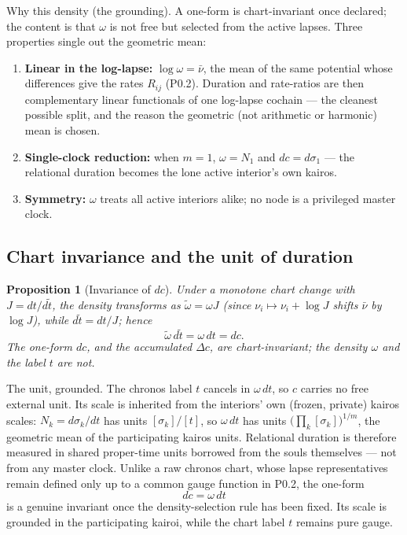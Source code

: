 \documentclass[11pt,a4paper]{article}
\def\mathfrak#1{#1}%
\def\emph#1{#1}%
\theoremstyle{definition}
\theoremstyle{plain}
\newtheorem{proposition}[definition]{Proposition}
\theoremstyle{remark}
\begin{document}
\emph{Why this density (the grounding).} A one-form is chart-invariant once declared;
the content is that \(\omega\) is not free but selected from the active lapses. Three
properties single out the geometric mean:
\begin{enumerate}[label=\textup{(\arabic*)},leftmargin=1.45cm]
\item \textbf{Linear in the log-lapse:} \(\log\omega=\bar\nu\), the \emph{mean} of the
same potential whose \emph{differences} give the rates \(R_{ij}\) (P0.2). Duration and
rate-ratios are then complementary linear functionals of one log-lapse cochain ---
the cleanest possible split, and the reason the geometric (not arithmetic or harmonic)
mean is chosen.
\item \textbf{Single-clock reduction:} when \(m=1\), \(\omega=N_{1}\) and
\(d\mathfrak c=d\sigma_{1}\) --- the relational duration becomes the lone active
interior's own kairos.
\item \textbf{Symmetry:} \(\omega\) treats all active interiors alike; no node is a
privileged master clock.
\end{enumerate}

\subsection{Chart invariance and the unit of duration}

\begin{proposition}[Invariance of \(d\mathfrak c\)]
Under a monotone chart change with \(J=dt/d\widetilde t\), the density transforms as
\(\widetilde\omega=\omega J\) (since \(\nu_i\mapsto\nu_i+\log J\) shifts \(\bar\nu\) by
\(\log J\)), while \(d\widetilde t=dt/J\); hence
\[
\widetilde\omega\,d\widetilde t=\omega\,dt=d\mathfrak c .
\]
The one-form \(d\mathfrak c\), and the accumulated \(\Delta\mathfrak c\), are
chart-invariant; the density \(\omega\) and the label \(t\) are not.
\end{proposition}

\emph{The unit, grounded.} The chronos label \(t\) cancels in \(\omega\,dt\), so
\(\mathfrak c\) carries no free external unit. Its scale is inherited from the
interiors' own (frozen, private) kairos scales: \(N_k=d\sigma_k/dt\) has units
\([\sigma_k]/[t]\), so \(\omega\,dt\) has units \(\bigl(\prod_k[\sigma_k]\bigr)^{1/m}\),
the geometric mean of the participating kairos units. Relational duration is therefore
measured in shared proper-time units borrowed from the souls themselves --- not from
any master clock. Unlike a raw chronos chart, whose lapse representatives remain defined only up
to a common gauge function in P0.2, the one-form
\[
d\mathfrak c=\omega\,dt
\]
is a genuine invariant once the density-selection rule has been fixed. Its scale
is grounded in the participating kairoi, while the chart label \(t\) remains
pure gauge.
\end{document}
